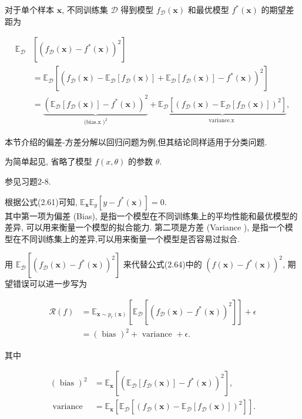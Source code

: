 \documentclass[10pt]{article}
\begin{document}
对于单个样本 $\boldsymbol{x}$, 不同训练集 $\mathcal{D}$ 得到模型 $f_{\mathcal{D}}(\boldsymbol{x})$ 和最优模型 $f^{*}(\boldsymbol{x})$ 的期望差距为


\begin{align*}
\mathbb{E}_{\mathcal{D}} & {\left[\left(f_{\mathcal{D}}(\boldsymbol{x})-f^{*}(\boldsymbol{x})\right)^{2}\right] } \\
& =\mathbb{E}_{\mathcal{D}}\left[\left(f_{\mathcal{D}}(\boldsymbol{x})-\mathbb{E}_{\mathcal{D}}\left[f_{\mathcal{D}}(\boldsymbol{x})\right]+\mathbb{E}_{\mathcal{D}}\left[f_{\mathcal{D}}(\boldsymbol{x})\right]-f^{*}(\boldsymbol{x})\right)^{2}\right]  \tag{2.65}\\
& =\underbrace{\left(\mathbb{E}_{\mathcal{D}}\left[f_{\mathcal{D}}(\boldsymbol{x})\right]-f^{*}(\boldsymbol{x})\right)^{2}}_{\text {(bias.x })^{2}}+\underbrace{\mathbb{E}_{\mathcal{D}}\left[\left(f_{\mathcal{D}}(\boldsymbol{x})-\mathbb{E}_{\mathcal{D}}\left[f_{\mathcal{D}}(\boldsymbol{x})\right]\right)^{2}\right]}_{\text {variance.x }}, \tag{2.66}
\end{align*}


本节介绍的偏差-方差分解以回归问题为例,但其结论同样适用于分类问题.

为简单起见, 省略了模型 $f(x, \theta)$ 的参数 $\theta$.

参见习题2-8.

根据公式(2.61)可知, $\mathbb{E}_{\boldsymbol{x}} \mathbb{E}_{y}\left[y-f^{*}(\boldsymbol{x})\right]=0$.\\
其中第一项为偏差 (Bias), 是指一个模型在不同训练集上的平均性能和最优模型的差异, 可以用来衡量一个模型的拟合能力. 第二项是方差 (Variance ), 是指一个模型在不同训练集上的差异,可以用来衡量一个模型是否容易过拟合.

用 $\mathbb{E}_{\mathcal{D}}\left[\left(f_{\mathcal{D}}(\boldsymbol{x})-f^{*}(\boldsymbol{x})\right)^{2}\right]$ 来代替公式(2.64)中的 $\left(f(\boldsymbol{x})-f^{*}(\boldsymbol{x})\right)^{2}$, 期望错误可以进一步写为


\begin{align*}
\mathcal{R}(f) & =\mathbb{E}_{\boldsymbol{x} \sim p_{r}(\boldsymbol{x})}\left[\mathbb{E}_{\mathcal{D}}\left[\left(f_{\mathcal{D}}(\boldsymbol{x})-f^{*}(\boldsymbol{x})\right)^{2}\right]\right]+\epsilon  \tag{2.67}\\
& =(\text { bias })^{2}+\text { variance }+\epsilon . \tag{2.68}
\end{align*}


其中


\begin{align*}
(\text { bias })^{2} & =\mathbb{E}_{\boldsymbol{x}}\left[\left(\mathbb{E}_{\mathcal{D}}\left[f_{\mathcal{D}}(\boldsymbol{x})\right]-f^{*}(\boldsymbol{x})\right)^{2}\right],  \tag{2.69}\\
\text { variance } & =\mathbb{E}_{\boldsymbol{x}}\left[\mathbb{E}_{\mathcal{D}}\left[\left(f_{\mathcal{D}}(\boldsymbol{x})-\mathbb{E}_{\mathcal{D}}\left[f_{\mathcal{D}}(\boldsymbol{x})\right]\right)^{2}\right]\right] . \tag{2.70}
\end{align*}
\end{document}
